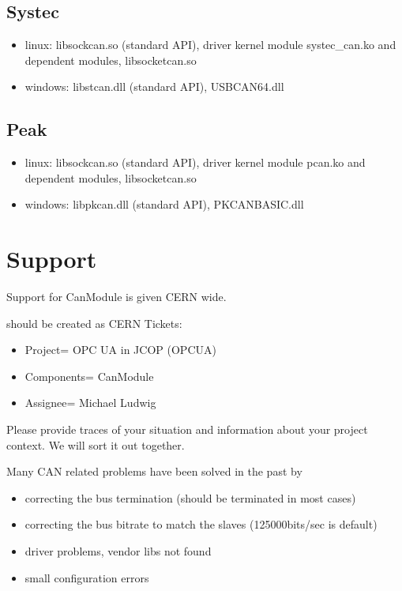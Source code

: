 \documentclass[a4paper,10pt,english]{sphinxmanual}
\begin{document}
\section{Systec}
\label{\detokenize{running:systec}}\begin{itemize}
\item {} 
linux: libsockcan.so (standard API), driver kernel module systec\_can.ko and dependent modules, libsocketcan.so

\item {} 
windows: libstcan.dll (standard API), USBCAN64.dll

\end{itemize}


\section{Peak}
\label{\detokenize{running:peak}}\begin{itemize}
\item {} 
linux: libsockcan.so (standard API), driver kernel module pcan.ko and dependent modules, libsocketcan.so

\item {} 
windows: libpkcan.dll (standard API), PKCANBASIC.dll

\end{itemize}


\chapter{Support}
\label{\detokenize{support:support}}\label{\detokenize{support::doc}}
Support for CanModule is given CERN wide.

 should be created as CERN  Tickets:
\begin{itemize}
\item {} 
Project= OPC UA in JCOP (OPCUA)

\item {} 
Components= CanModule

\item {} 
Assignee= Michael Ludwig

\end{itemize}

Please provide traces of your situation and information about your project context. We will sort it out together.

Many CAN related problems have been solved in the past by
\begin{itemize}
\item {} 
correcting the bus termination (should be terminated in most cases)

\item {} 
correcting the bus bitrate to match the slaves (125000bits/sec is default)

\item {} 
driver problems, vendor libs not found

\item {} 
small configuration errors

\end{itemize}
\end{document}
